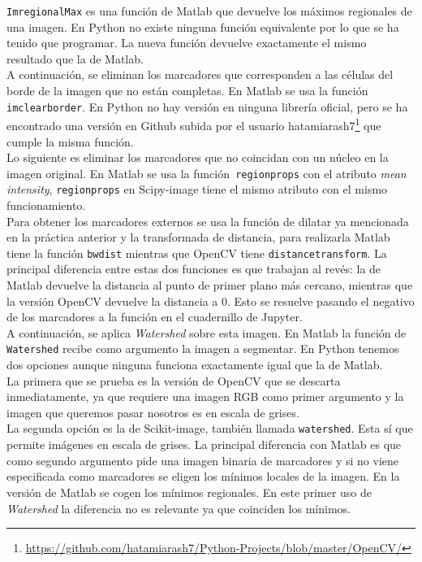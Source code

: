 \texttt{ImregionalMax} es una función de Matlab que devuelve los máximos regionales de una imagen. En Python no existe ninguna función equivalente por lo que se ha tenido que programar. La nueva función devuelve exactamente el mismo resultado que la de Matlab.\\

A continuación, se eliminan los marcadores que corresponden a las células del borde de la imagen que no están completas. En Matlab se usa la función \texttt{imclearborder}. En Python no hay versión en ninguna librería oficial, pero se ha encontrado una versión en Github subida por el usuario hatamiarash7\footnote{\url{https://github.com/hatamiarash7/Python-Projects/blob/master/OpenCV/}} que cumple la misma función.\\

Lo siguiente es eliminar los marcadores que no coincidan con un núcleo en la imagen original. En Matlab se usa la función\texttt{ regionprops} con el atributo \emph{mean intensity}, \texttt{regionprops} en Scipy-image tiene el mismo atributo con el mismo funcionamiento.\\

Para obtener los marcadores externos se usa la función de dilatar ya mencionada en la práctica anterior y la transformada de distancia, para realizarla Matlab tiene la función \texttt{bwdist} mientras que OpenCV tiene \texttt{distancetransform}. La principal diferencia entre estas dos funciones es que trabajan al revés: la de Matlab devuelve la distancia al punto de primer plano más cercano, mientras que la versión OpenCV devuelve la distancia a 0. Esto se resuelve pasando el negativo de los marcadores a la función en el cuadernillo de Jupyter.\\

A continuación, se aplica \emph{Watershed} sobre esta imagen. En Matlab la función de \texttt{Watershed} recibe como argumento la imagen a segmentar. En Python tenemos dos opciones aunque ninguna funciona exactamente igual que la de Matlab.\\

La primera que se prueba es la versión de OpenCV que se descarta inmediatamente, ya que requiere una imagen RGB como primer argumento y la imagen que queremos pasar nosotros es en escala de grises.\\

La segunda opción es la de Scikit-image, también llamada \texttt{watershed}. Esta sí que permite imágenes en escala de grises. La principal diferencia con Matlab es que como segundo argumento pide una imagen binaria de marcadores y si no viene especificada como marcadores se eligen los mínimos locales de la imagen. En la versión de Matlab se cogen los mínimos regionales. En este primer uso de \emph{Watershed} la diferencia no es relevante ya que coinciden los mínimos.\\

